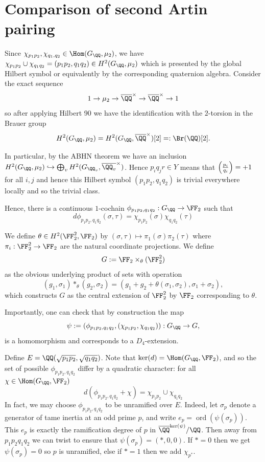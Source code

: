 \documentclass{lecturenotes}
\numberwithin{equation}{section}
\begin{document}
\section{Comparison of second Artin pairing}
Since $\chi_{p_1p_2},\chi_{q_1,q_2}\in \Hom(G_\QQ,\mu_2)$, we have $\chi_{p_1p_2}\cup \chi_{q_1q_2}=(p_1p_2,q_1q_2)\in H^2(G_\QQ,\mu_2)$ which is presented by the global Hilbert symbol or equivalently by the corresponding quaternion algebra.  Consider the exact sequence 
\[1\to \mu_2\to \bar{\QQ}^\times\to \bar{\QQ}^\times\to 1\]
so after applying Hilbert 90 we have the identification with the $2$-torsion in the Brauer group
\[H^2(G_\QQ,\mu_2)=H^2(G_\QQ,\bar{\QQ}^\times)[2]=:\Br(\QQ)[2].\]

\noindent In particular, by the ABHN theorem we have an inclusion $H^2(G_\QQ, \mu_2)\hookrightarrow \bigoplus_vH^2(G_{\QQ_v}, \bar{\QQ_v}^\times)$.  Hence $p_iq_jr\in Y$ means that $\left(\frac{p_i}{q_i}\right)=+1$ for all $i,j$ and hence this Hilbert symbol $(p_1p_2,q_1q_2)$ is trivial everywhere locally and so the trivial class.

Hence, there is a continuous $1$-cochain $\phi_{p_1p_2,q_1q_2}:G_\QQ\to \FF_2$ such that 
\begin{equation}\label{eq:secondcoboundary}
d\phi_{p_1p_2,q_1q_2}(\sigma,\tau)=\chi_{p_1p_2}(\sigma)\chi_{q_1q_2}(\tau)
\end{equation}
\begin{definition}
    We define $\theta\in H^2(\FF_2^2,\FF_2)$ by $(\sigma,\tau)\mapsto \pi_1(\sigma)\pi_2(\tau)$ where $\pi_i:\FF_2^2\to \FF_2$ are the natural coordinate projections.  We define 
    \[G:=\FF_2\times_\theta (\FF_2^2)\]
    as the obvious underlying product of sets with operation
    \[(g_1,\sigma_1)*_\theta(g_2,\sigma_2)=(g_1+g_2+\theta(\sigma_1,\sigma_2), \sigma_1+\sigma_2),\]
    which constructs $G$ as the central extension of $\FF_2^2$ by $\FF_2$ corresponding to $\theta$.
\end{definition}

\noindent Importantly, one can check that by construction the map
\[\psi:=(\phi_{p_1p_2,q_1q_2},(\chi_{p_1p_2},\chi_{q_1q_2})):G_\QQ\to G,\]
is a homomorphism and corresponds to a $D_4$-extension.


Define $E=\QQ(\sqrt{p_1p_2},\sqrt{q_1q_2})$.  Note that $\ker(d)=\Hom(G_\QQ,\FF_2)$, and so the set of possible $\phi_{p_1p_2,q_1q_2}$ differ by a quadratic character:  for all $\chi\in \Hom(G_\QQ,\FF_2)$
\[d(\phi_{p_1p_2,q_1q_2}+\chi)=\chi_{p_1p_2}\cup\chi_{q_1q_2}\]
In fact, we may choose $\phi_{p_1p_2,q_1q_2}$ to be unramified over $E$.  Indeed, let $\sigma_p$ denote a generator of tame inertia at an odd prime $p$, and write $e_p=\operatorname{ord}(\psi(\sigma_p))$.  This $e_p$ is exactly the ramification degree of $p$ in $\bar{\QQ}^{\ker(\psi)}/\QQ$.  Then away from $p_1p_2q_1q_2$ we can twist to ensure that $\psi(\sigma_p)=(*,0,0)$.  If $*=0$ then we get $\psi(\sigma_p)=0$ so $p$ is unramified, else if $*=1$ then we add $\chi_{p^*}$.
\end{document}
